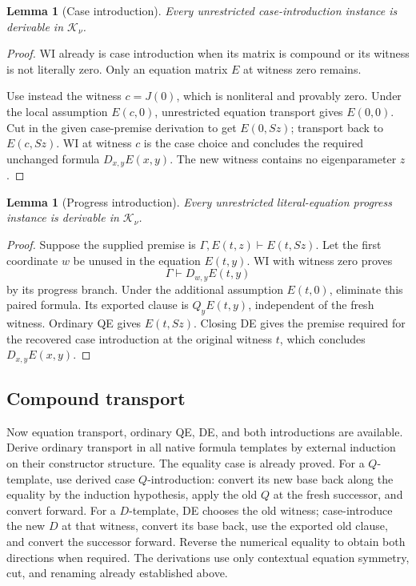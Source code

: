 \documentclass[11pt]{article}
\newtheorem{lemma}[theorem]{Lemma}
\theoremstyle{definition}
\newcommand{\Knorm}{\mathcal K_\nu}
\begin{document}
\begin{lemma}[Case introduction]\label{cr:case}
Every unrestricted case-introduction instance is derivable in \(\Knorm\).
\end{lemma}
\begin{proof}
WI already is case introduction when its matrix is compound or its witness is not literally zero. Only an equation matrix \(E\) at witness zero remains.

Use instead the witness \(c=J(0)\), which is nonliteral and provably zero. Under the local assumption \(E(c,0)\), unrestricted equation transport gives \(E(0,0)\). Cut in the given case-premise derivation to get \(E(0,Sz)\); transport back to \(E(c,Sz)\). WI at witness \(c\) is the case choice and concludes the required unchanged formula \(D_{x,y}E(x,y)\). The new witness contains no eigenparameter \(z\).
\end{proof}

\begin{lemma}[Progress introduction]\label{cr:progress}
Every unrestricted literal-equation progress instance is derivable in \(\Knorm\).
\end{lemma}
\begin{proof}
Suppose the supplied premise is
\(\Gamma,E(t,z)\vdash E(t,Sz)\).
Let the first coordinate \(w\) be unused in the equation \(E(t,y)\). WI with witness zero proves
\[
\Gamma\vdash D_{w,y}E(t,y)
\]
by its progress branch. Under the additional assumption \(E(t,0)\), eliminate this paired formula. Its exported clause is \(Q_yE(t,y)\), independent of the fresh witness. Ordinary QE gives \(E(t,Sz)\). Closing DE gives the premise required for the recovered case introduction at the original witness \(t\), which concludes \(D_{x,y}E(x,y)\).
\end{proof}

\subsection{Compound transport}

Now equation transport, ordinary QE, DE, and both introductions are available. Derive ordinary transport in all native formula templates by external induction on their constructor structure. The equality case is already proved. For a \(Q\)-template, use derived case \(Q\)-introduction: convert its new base back along the equality by the induction hypothesis, apply the old \(Q\) at the fresh successor, and convert forward. For a \(D\)-template, DE chooses the old witness; case-introduce the new \(D\) at that witness, convert its base back, use the exported old clause, and convert the successor forward. Reverse the numerical equality to obtain both directions when required. The derivations use only contextual equation symmetry, cut, and renaming already established above.
\end{document}
